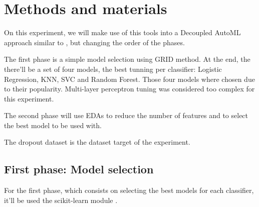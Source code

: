 \documentclass[10pt]{IEEEtran}
\begin{document}
\section{ Methods and materials }
On this experiment, we will make use of this tools into a Decoupled AutoML
approach similar to \cite{QUEMY2020101483}, but changing the order of the phases.

The first phase is a simple model selection using GRID method.
At the end, the there'll be a set of four models, the best tunning per classifier:
Logistic Regression, KNN, SVC and Random Forest.
Those four models where chosen due to their popularity. Multi-layer perceptron tuning was
considered too complex for this experiment.

The second phase will use EDAs to reduce the number of features and to select the best model
to be used with.

The dropout dataset \cite{https://doi.org/10.24432/c5mc89} is the dataset target of the experiment.

\subsection{ First phase: Model selection }
For the first phase, which consists on selecting the best models for each classifier, it'll be
used the scikit-learn module \cite{sklearn_10.5555/1953048.2078195}.
\end{document}
